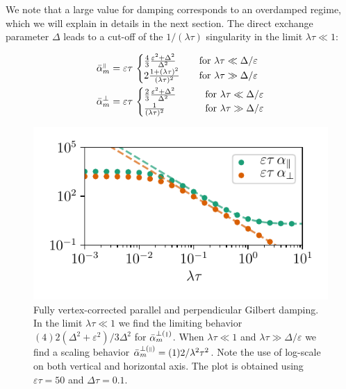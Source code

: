 We note that a large value for damping corresponds to an overdamped regime, which we will explain in details in the next section. The direct exchange parameter $\Delta$ leads to a cut-off of the $1/(\lambda\tau)$ singularity in the limit $\lambda\tau\ll1$:

\begin{align}
\label{eq:alphapara}
    \bar{\alpha}_m^{{\scriptscriptstyle\parallel}} &= 
    {\varepsilon\tau}\,  \begin{cases}
        \frac{4}{3}\frac{\varepsilon^2+\Delta^2}{\Delta^2}
            &\quad \text{for } \lambda\tau        \ll \Delta/\varepsilon\\
        2\frac{1+(\lambda\tau)^2}{(\lambda\tau)^2}
            &\quad \text{for } \lambda\tau \gg \Delta/\varepsilon 
    \end{cases}\\
    \label{eq:alphaperp}
    \bar{\alpha}_m^{\perp} &= {\varepsilon\tau}\,
    \begin{cases}
        \frac{2}{3}\frac{\varepsilon^2+\Delta^2}{\Delta^2}
            \quad\quad &\text{for } \lambda\tau        \ll \Delta/\varepsilon\\
        \frac{1}{(\lambda\tau)^2}
            \quad &\text{for } \lambda\tau \gg \Delta/\varepsilon 
    \end{cases}
\end{align}
\begin{figure}
    \centering
    \includegraphics[width=0.75\linewidth]{gfx/alpha_full}
    \caption{Fully vertex-corrected parallel and perpendicular Gilbert damping. In the limit $\lambda\tau\ll1$ we find the limiting behavior $(4)2(\Delta^2+\varepsilon^2)/3\Delta^2$ for $\bar{\alpha}_m^{\perp({\scriptscriptstyle\parallel})}$. When $\lambda\tau\ll 1$ and $\lambda\tau\gg\Delta/\varepsilon$ we find a scaling behavior $\bar{\alpha}_m^{\perp({\scriptscriptstyle\parallel})}=(1)2/\lambda^2\tau^2$. Note the use of log-scale on both vertical and horizontal axis. The plot is obtained using $\varepsilon\tau=50$ and $\Delta\tau=0.1$. }
    \label{fig:alpha_plot}
\end{figure}



